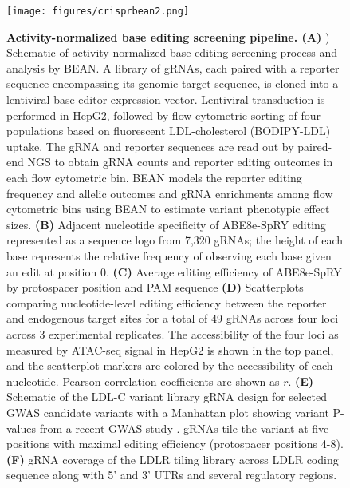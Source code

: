 \documentclass[a4paper, titlepage, openright]{book}
\begin{document}
\begin{figure}
	\centering
	\texttt{[image: figures/crisprbean2.png]}
	\caption[Activity-normalized base editing screening pipeline]{\textbf{Activity-normalized base editing screening pipeline. (A)} ) Schematic of activity-normalized base editing screening process and analysis by BEAN. A library of gRNAs, each paired with a reporter sequence encompassing its genomic target sequence, is cloned into a lentiviral base editor expression vector. Lentiviral transduction is performed in HepG2, followed by flow cytometric sorting of four populations based on fluorescent LDL-cholesterol (BODIPY-LDL) uptake. The gRNA and reporter sequences are read out by paired-end NGS to obtain gRNA counts and reporter editing outcomes in each flow cytometric bin. BEAN models the reporter editing frequency and allelic outcomes and gRNA enrichments among flow cytometric bins using BEAN to estimate variant phenotypic effect sizes. \textbf{(B)} Adjacent nucleotide specificity of ABE8e-SpRY editing represented as a sequence logo from 7,320 gRNAs; the height of each base represents the relative frequency of observing each base given an edit at position 0.  \textbf{(C)} Average editing efficiency of ABE8e-SpRY by protospacer position and PAM sequence \textbf{(D)} Scatterplots comparing nucleotide-level editing efficiency between the reporter and endogenous target sites for a total of 49 gRNAs across four loci across 3 experimental replicates. The accessibility of the four loci as measured by ATAC-seq signal in HepG2 is shown in the top panel, and the scatterplot markers are colored by the accessibility of each nucleotide. Pearson correlation coefficients are shown as $r$. \textbf{(E)} Schematic of the LDL-C variant library gRNA design for selected GWAS candidate variants with a Manhattan plot showing variant P-values from a recent GWAS study \citep{klimentidis2020phenotypic}.  gRNAs tile the variant at five positions with maximal editing efficiency (protospacer positions 4-8).  \textbf{(F)} gRNA coverage of the LDLR tiling library across LDLR coding sequence along with 5’ and 3’ UTRs and several regulatory regions. }
	\label{fig:crisprbean2}
\end{figure} 
\end{document}
